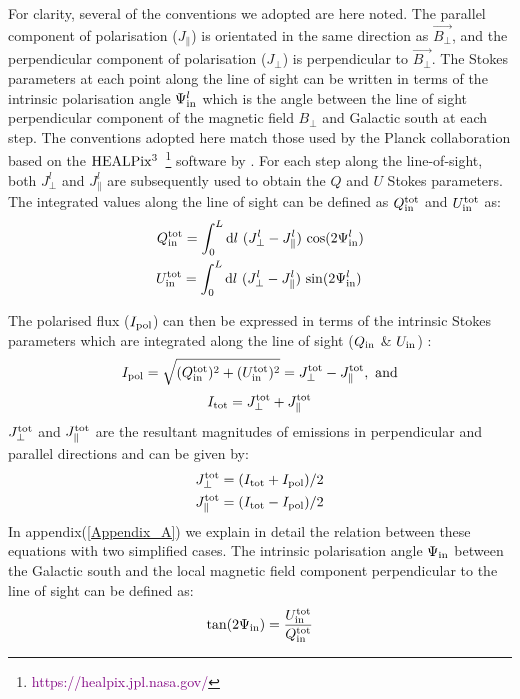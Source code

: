 \documentclass[12pt, a4 paper]{article}
\begin{document}
For clarity, several of the conventions we adopted are here noted. The parallel component of polarisation (${J_{\parallel}}$) is orientated in the same direction as  $\vec{B_{\perp}}$, and the perpendicular component of polarisation (${J_{\perp}}$) is perpendicular to $\vec{B_{\perp}}$. The Stokes parameters at each point along the line of sight can be written in terms of the intrinsic polarisation angle $\Psi^l_{\rm in}$ which is the angle between the line of sight perpendicular component of the magnetic field $B_{\perp}$ and Galactic south at each step. The conventions adopted here match those used by the Planck collaboration \cite{Planck_XIX} based on the $\rm HEALPix^3$~\footnote{\textcolor{purple}{https://healpix.jpl.nasa.gov/}} software by \cite{Healpix_2005}. For each step along the line-of-sight, both  ${J_{\perp}^l}$ and ${J_{\parallel}^l}$ are subsequently used to obtain the $Q$ and $U$ Stokes parameters. The integrated values along the line of sight can be defined as  $Q^{\rm tot}_{\rm in}$ and $U^{\rm tot}_{\rm in}$ as:
\begin{eqnarray}
Q_{\rm in}^{\rm tot} = {\int_0^L \mathrm{d}l \ ({J_{\perp}^l} - J_{\parallel}^l) \ {\cos}(2\Psi^l_{\rm in}) } \\
U_{\rm in}^{\rm tot} = {\int_0^L \mathrm{d}l \ ({J_{\perp}^l} - J_{\parallel}^l) \ {\sin}(2\Psi^l_{\rm in})} \,
\end{eqnarray}


The polarised flux ($I_{\rm pol}$) can then be expressed in terms of the intrinsic Stokes parameters which are integrated along the line of sight (${Q_{\rm in}}$ \& ${U_{\rm in}}$) :
\begin{eqnarray} \label{eq_I_pol}
I_{\rm pol} = \sqrt{(Q_{\rm in}^{\rm tot})^2+(U_{\rm in}^{\rm tot})^2} = J_{\perp}^{\rm tot} - J_{\parallel}^{\rm tot} ,\ \rm and
\end{eqnarray}
\begin{equation} \label{eq_I_tot}
    I_{\rm tot} = J_{\perp}^{\rm tot} + J_{\parallel}^{\rm tot} 
\end{equation}
$J_{\perp}^{\rm tot}$ and $J_{\parallel}^{\rm tot}$ are the resultant magnitudes of emissions in perpendicular and parallel directions and can be given by:
\begin{eqnarray}
J_{\perp}^{\rm tot} = (I_{\rm tot} + I_{\rm pol})/2 \\
J_{\parallel}^{\rm tot} = (I_{\rm tot} - I_{\rm pol})/2 
\end{eqnarray}
In appendix(\ref{Appendix_A}) we explain in detail the relation between these equations with two simplified cases.
The intrinsic polarisation angle $\Psi_{\rm in}$ between the Galactic south and the local magnetic field component perpendicular to the line of sight can be defined as:
\begin{eqnarray}
\tan(2\Psi_{\rm in}) = \frac{U_{\rm in}^{\rm tot}}{Q_{\rm in}^{\rm tot}} 
\end{eqnarray}
\end{document}
